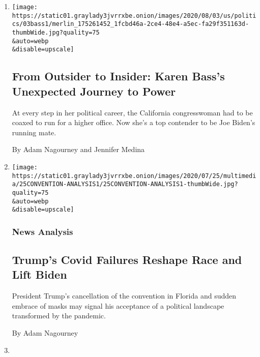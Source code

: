 \begin{enumerate}
\def\labelenumi{\arabic{enumi}.}
\item
  \href{/2020/08/04/us/politics/karen-bass-vice-president-biden.html}{}

  \texttt{[image: https://static01.graylady3jvrrxbe.onion/images/2020/08/03/us/politics/03bass1/merlin\_175261452\_1fcbd46a-2ce4-48e4-a5ec-fa29f351163d-thumbWide.jpg?quality=75\\\&auto=webp\\\&disable=upscale]}

  \hypertarget{from-outsider-to-insider-karen-basss-unexpected-journey-to-power}{%
  \subsection{From Outsider to Insider: Karen Bass's Unexpected Journey
  to
  Power}\label{from-outsider-to-insider-karen-basss-unexpected-journey-to-power}}

  At every step in her political career, the California congresswoman
  had to be coaxed to run for a higher office. Now she's a top contender
  to be Joe Biden's running mate.

  By Adam Nagourney and Jennifer Medina
\item
  \href{/2020/07/25/us/politics/trump-florida-convention.html}{}

  \texttt{[image: https://static01.graylady3jvrrxbe.onion/images/2020/07/25/multimedia/25CONVENTION-ANALYSIS1/25CONVENTION-ANALYSIS1-thumbWide.jpg?quality=75\\\&auto=webp\\\&disable=upscale]}

  \hypertarget{news-analysis}{%
  \subsubsection{News Analysis}\label{news-analysis}}

  \hypertarget{trumps-covid-failures-reshape-race-and-lift-biden}{%
  \subsection{Trump's Covid Failures Reshape Race and Lift
  Biden}\label{trumps-covid-failures-reshape-race-and-lift-biden}}

  President Trump's cancellation of the convention in Florida and sudden
  embrace of masks may signal his acceptance of a political landscape
  transformed by the pandemic.

  By Adam Nagourney
\item
  \href{/2020/07/17/us/trump-biden-2020-election.html}{}


\end{enumerate}
